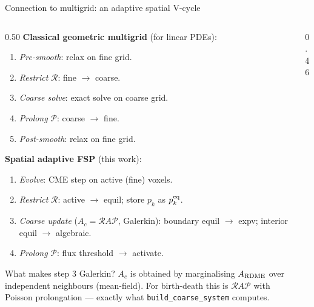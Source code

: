 \documentclass[10pt,aspectratio=169]{beamer}
\newcommand{\calR}{\mathcal{R}}
\newcommand{\calP}{\mathcal{P}}
\begin{document}
\begin{frame}[shrink=6]{Connection to multigrid: an adaptive spatial V-cycle}

  \begin{columns}[T]
    \begin{column}{0.50\textwidth}
      \textbf{Classical geometric multigrid} (for linear PDEs):
      \begin{enumerate}\setlength\itemsep{0.3em}
        \item \textit{Pre-smooth}: relax on fine grid.
        \item \textit{Restrict} $\calR$: fine $\to$ coarse.
        \item \textit{Coarse solve}: exact solve on coarse grid.
        \item \textit{Prolong} $\calP$: coarse $\to$ fine.
        \item \textit{Post-smooth}: relax on fine grid.
      \end{enumerate}

      \medskip
      \textbf{Spatial adaptive FSP} (this work):
      \begin{enumerate}\setlength\itemsep{0.3em}
        \item \textit{Evolve}: CME step on active (fine) voxels.
        \item \textit{Restrict} $\calR$: active $\to$ equil; store $p_k$ as $p_k^{\rm eq}$.
        \item \textit{Coarse update} ($A_c = \calR A \calP$, Galerkin):
              boundary equil $\to$ expv; interior equil $\to$ algebraic.
        \item \textit{Prolong} $\calP$: flux threshold $\to$ activate.
      \end{enumerate}

      \medskip
      \begin{block}{What makes step 3 Galerkin?}
        $A_c$ is obtained by marginalising $A_{\rm RDME}$ over independent
        neighbours (mean-field).  For birth-death this is
        $\calR A \calP$ with Poisson prolongation --- exactly what
        \texttt{build\_coarse\_system} computes.
      \end{block}
    \end{column}
    \begin{column}{0.46\textwidth}
      \begin{center}
\end{center}
\end{column}
\end{columns}
\end{frame}
\end{document}
